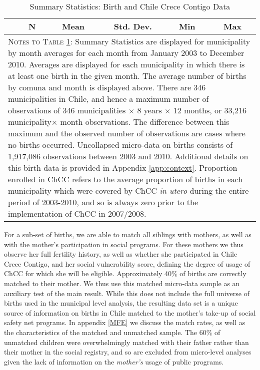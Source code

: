 \documentclass[12pt]{article}
\begin{document}
\begin{spacing}{1.4}
\begin{table}[htpb!]
  \begin{center}
    \caption{Summary Statistics: Birth and Chile Crece Contigo Data}
    \label{tab:sumstats}
    \begin{tabular}{lccccc} \toprule
      & N& Mean & Std. Dev. & Min & Max \\ \midrule
       \midrule
      \multicolumn{6}{p{14.2cm}}{{\footnotesize \textsc{Notes to Table
            \ref{tab:sumstats}}: Summary Statistics are displayed for
          municipality by month averages for
          each month from January 2003 to December 2010.  Averages are
          displayed for each municipality in which there is at least one
          birth in the given month.  The average number of births by
          comuna and month is displayed above.  There are 346 municipalities
          in Chile, and hence a maximum number of observations of 346
          municipalities $\times$ 8 years $\times$ 12 months, or 33,216
          municipality$\times$ month observations.  The difference between
          this maximum and the observed number of observations are cases
          where no births occurred.  Uncollapsed micro-data on births
          consists of 1,917,086 observations between 2003 and 2010.
          Additional details on this birth data is provided in
          Appendix \ref{app:context}.  Proportion enrolled in ChCC
          refers to the average proportion of births in each municipality
          which were covered by ChCC \emph{in utero} during the entire
          period of 2003-2010, and so is always zero prior to the implementation
          of ChCC in 2007/2008.
      }} \\ \bottomrule
      \end{tabular}
  \end{center}
\end{table}

For a sub-set of births, we are able to match all siblings with
mothers, as well as with the mother's participation in social
programs.  For these mothers we thus observe her full fertility
history, as well as whether she participated in Chile Crece Contigo,
and her social vulnerability score, defining the degree of usage
of ChCC for which she will be eligible.  Approximately 40\% of
births are correctly matched to their mother.  We thus use this
matched micro-data sample as an auxiliary test of the main result.
While this does not include the full universe of births used in
the municipal level analysis, the resulting data set is a unique
source of information on births in Chile matched to the mother's
take-up of social safety net programs.  In appendix \ref{MFE}
we discuss the match rates, as well as the characteristics of
the matched and unmatched sample.  The 60\% of unmatched children
were overwhelmingly matched with their father rather than their
mother in the social registry, and so are excluded from micro-level
analyses given the lack of information on the \emph{mother's} usage
of public programs.


\end{spacing}
\end{document}
